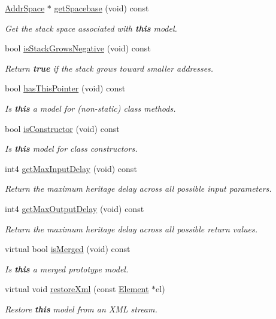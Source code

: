 \begin{DoxyCompactItemize}
\mbox{\hyperlink{class_addr_space}{Addr\+Space}} $\ast$ \mbox{\hyperlink{class_proto_model_a9918d9e7595d9f33f53bd9ffd3118f19}{get\+Spacebase}} (void) const
\begin{DoxyCompactList}\small\item\em Get the stack space associated with {\bfseries{this}} model. \end{DoxyCompactList}\item 
bool \mbox{\hyperlink{class_proto_model_a9fd453910b4e750e3c67f26969c17001}{is\+Stack\+Grows\+Negative}} (void) const
\begin{DoxyCompactList}\small\item\em Return {\bfseries{true}} if the stack {\itshape grows} toward smaller addresses. \end{DoxyCompactList}\item 
bool \mbox{\hyperlink{class_proto_model_aace107c2668bbd0091159f5c9e5a9042}{has\+This\+Pointer}} (void) const
\begin{DoxyCompactList}\small\item\em Is {\bfseries{this}} a model for (non-\/static) class methods. \end{DoxyCompactList}\item 
bool \mbox{\hyperlink{class_proto_model_a8699b4b61ebc7565dbfd7ec7ab600eca}{is\+Constructor}} (void) const
\begin{DoxyCompactList}\small\item\em Is {\bfseries{this}} model for class constructors. \end{DoxyCompactList}\item 
int4 \mbox{\hyperlink{class_proto_model_a0a6e71fa168f7af91d6b658516a61326}{get\+Max\+Input\+Delay}} (void) const
\begin{DoxyCompactList}\small\item\em Return the maximum heritage delay across all possible input parameters. \end{DoxyCompactList}\item 
int4 \mbox{\hyperlink{class_proto_model_a6692a33595e306f23f23d98093a006bf}{get\+Max\+Output\+Delay}} (void) const
\begin{DoxyCompactList}\small\item\em Return the maximum heritage delay across all possible return values. \end{DoxyCompactList}\item 
virtual bool \mbox{\hyperlink{class_proto_model_a580207b945d3734b6f1e6023b3ca2678}{is\+Merged}} (void) const
\begin{DoxyCompactList}\small\item\em Is {\bfseries{this}} a merged prototype model. \end{DoxyCompactList}\item 
virtual void \mbox{\hyperlink{class_proto_model_a8fe30abbc7fe1c709b1b8fe9c81803b8}{restore\+Xml}} (const \mbox{\hyperlink{class_element}{Element}} $\ast$el)
\begin{DoxyCompactList}\small\item\em Restore {\bfseries{this}} model from an X\+ML stream. \end{DoxyCompactList}\end{DoxyCompactItemize}

